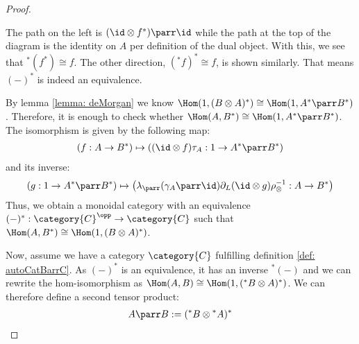 \documentclass[DIN, pagenumber=false, fontsize=11pt, parskip=half, colorinlistoftodos, svgnames]{scrartcl}
\begin{document}
\begin{proof}
\begin{center}
\begin{sideways}
			\end{sideways}
		\end{center}
		
		The path on the left is $(\id \otimes f^*) \parr \id $ while the path at the top of the diagram is the identity on $A$ per definition of the dual object. With this, we see that ${^*}(f^*) \cong f$. The other direction, $({^*f})^*\cong f$, is shown similarly. That means $(-)^*$ is indeed an equivalence.  
		
		By lemma \ref{lemma: deMorgan} we know 
		$\Hom(1, (B \otimes A)^* ) \cong \Hom(1, A^* \parr B^*) $. 
		Therefore, it is enough to check whether 
		$\Hom(A, B^*) \cong \Hom(1, A^* \parr B^*) $.
		The isomorphism is given by the following map:
		\begin{align*}
			(f: A\rightarrow B^*) 
			\mapsto 
			\left((\id \otimes f)\tau_A : 1 \rightarrow A^* \parr B^* \right)
		\end{align*} 
		and its inverse:
		\begin{align*}
			(g: 1\rightarrow A^* \parr B^*) 
			\mapsto 
			\left(\lambda_\parr(\gamma_A  \parr \id) \partial_L (\id \otimes g) \rho_\otimes^{-1} : A \rightarrow B^* \right)
		\end{align*}
		Thus, we obtain a monoidal category with an equivalence 
		$(-)^*:\category{C}^\opp \rightarrow \category{C} $ 
		such that 
		$\Hom(A, B^*) \cong \Hom(1, (B \otimes A)^* )$.
		
		Now, assume we have a category $\category{C}$ fulfilling definition \ref{def: autoCatBarrC}. As $(-)^*$ is an equivalence, it has an inverse ${^*(-)}$ and we can rewrite the hom-isomorphism as $\Hom(A, B) \cong \Hom( 1, ( {^*B} \otimes A )^* )$.
		We can therefore define a second tensor product: 
		\begin{align*}
			A \parr B := ({^*B} \otimes {^*A})^*
		\end{align*} 
		

\end{proof}
\end{document}
